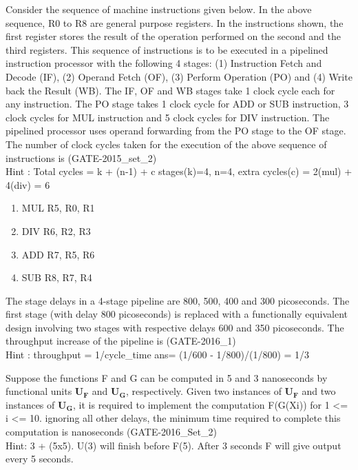 \begin{questyle}
  \question  Consider the sequence of machine instructions given below. In the above
             sequence, R0 to R8 are general purpose registers. In the instructions shown, the
             first register stores the result of the operation performed on the second and the
             third registers. This sequence of instructions is to be executed in a pipelined
             instruction processor with the following 4 stages: (1) Instruction Fetch and
             Decode (IF), (2) Operand Fetch (OF), (3) Perform Operation (PO) and (4) Write
             back the Result (WB). The IF, OF and WB stages take 1 clock cycle each for any
             instruction. The PO stage takes 1 clock cycle for ADD or SUB instruction, 3 clock cycles
             for MUL instruction and 5 clock cycles for DIV instruction. The pipelined processor
             uses operand forwarding from the PO stage to the OF stage. The number of clock cycles
             taken for the execution of the above sequence of instructions is \fillin[13] (GATE-2015\_set\_2) \\
             Hint : Total cycles = k + (n-1) + c \quad stages(k)=4, n=4,  extra cycles(c) = 2(mul) + 4(div) = 6

             \begin{enumerate}
                \item MUL R5, R0, R1
                \item DIV R6, R2, R3
                \item ADD R7, R5, R6
                \item SUB R8, R7, R4
            \end{enumerate}
\end{questyle}

\begin{questyle}
  \question  The stage delays in a 4-stage pipeline are 800, 500, 400 and 300 picoseconds. The
             first stage (with delay 800 picoseconds) is replaced with a functionally equivalent
             design involving two stages with respective delays 600 and 350 picoseconds. The
             throughput increase of the pipeline is  \fillin[33.33 \%] (GATE-2016\_1) \\
             Hint : throughput = 1/cycle\_time \qquad ans= (1/600 - 1/800)/(1/800) = 1/3

\end{questyle}

\begin{questyle}
  \question  Suppose the functions F and G can be computed in 5 and 3 nanoseconds by functional
             units \( \boldsymbol {U_F } \) and \(\boldsymbol {U_G}\), respectively. Given two
             instances of \(\boldsymbol {U_F}\) and two instances of \(\boldsymbol {U_G} \), it is
             required to implement the computation F(G(Xi)) for 1 \textless= i \textless= 10. ignoring all other
             delays, the minimum time required to complete this computation is \fillin[28] nanoseconds   (GATE-2016\_Set\_2)\\
             Hint: 3 + (5x5). U(3) will finish before F(5). After 3 seconds F will give output every 5 seconds.
\end{questyle}


